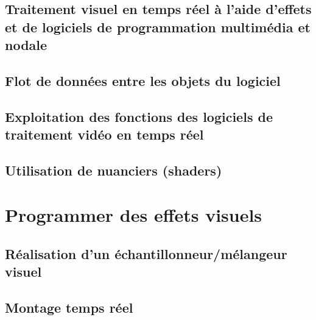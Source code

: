 \documentclass[
]{book}
\begin{document}
\hypertarget{traitement-visuel-en-temps-ruxe9el-uxe0-laide-deffets-et-de-logiciels-de-programmation-multimuxe9dia-et-nodale}{%
\section{Traitement visuel en temps réel à l'aide d'effets et de logiciels de programmation multimédia et nodale}\label{traitement-visuel-en-temps-ruxe9el-uxe0-laide-deffets-et-de-logiciels-de-programmation-multimuxe9dia-et-nodale}}

\hypertarget{flot-de-donnuxe9es-entre-les-objets-du-logiciel}{%
\section{Flot de données entre les objets du logiciel}\label{flot-de-donnuxe9es-entre-les-objets-du-logiciel}}

\hypertarget{exploitation-des-fonctions-des-logiciels-de-traitement-viduxe9o-en-temps-ruxe9el}{%
\section{Exploitation des fonctions des logiciels de traitement vidéo en temps réel}\label{exploitation-des-fonctions-des-logiciels-de-traitement-viduxe9o-en-temps-ruxe9el}}

\hypertarget{utilisation-de-nuanciers-shaders}{%
\section{Utilisation de nuanciers (shaders)}\label{utilisation-de-nuanciers-shaders}}

\hypertarget{programmer}{%
\chapter{Programmer des effets visuels}\label{programmer}}

\hypertarget{ruxe9alisation-dun-uxe9chantillonneurmuxe9langeur-visuel}{%
\section{Réalisation d'un échantillonneur/mélangeur visuel}\label{ruxe9alisation-dun-uxe9chantillonneurmuxe9langeur-visuel}}

\hypertarget{montage-temps-ruxe9el}{%
\section{Montage temps réel}\label{montage-temps-ruxe9el}}
\end{document}
